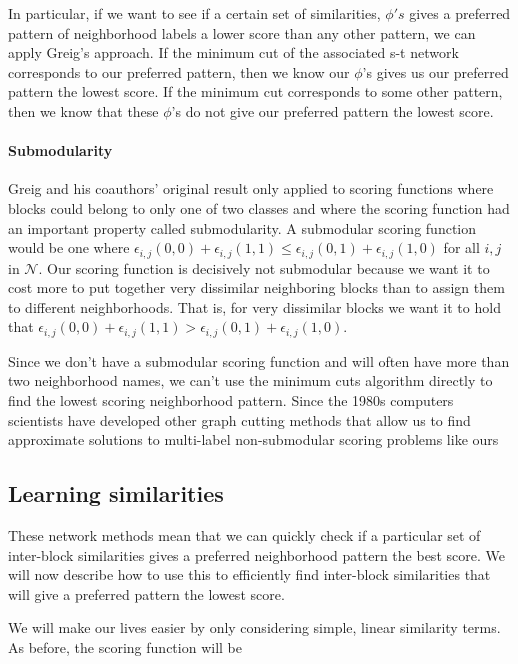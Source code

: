 In particular, if we want to see if a certain set of similarities,
$\phi's$ gives a preferred pattern of neighborhood labels a lower
score than any other pattern, we can apply Greig's approach. If the
minimum cut of the associated s-t network corresponds to our preferred
pattern, then we know our $\phi$'s gives us our
preferred pattern the lowest score. If the minimum cut corresponds to
some other pattern, then we know that these $\phi$'s do not give our
preferred pattern the lowest score.

\paragraph{Submodularity}
Greig and his coauthors' original result only applied to scoring functions 
where blocks could belong to only one of two classes and where the
scoring function had an important property called submodularity.  A
submodular scoring function would be one where $\epsilon_{i,j}(0,0) +
\epsilon_{i,j}(1,1) \leq \epsilon_{i,j}(0,1) + \epsilon_{i,j}(1,0)$
for all $i,j$ in $\mathcal{N}$. Our scoring function is decisively not
submodular because we want it to cost more to put together very
dissimilar neighboring blocks than to assign them to different
neighborhoods. That is, for very dissimilar blocks we want it to hold
that $\epsilon_{i,j}(0,0) + \epsilon_{i,j}(1,1) \boldsymbol{>}
\epsilon_{i,j}(0,1) + \epsilon_{i,j}(1,0)$.

Since we don't have a submodular scoring function and will often have
more than two neighborhood names, we can't use the minimum cuts
algorithm directly to find the lowest scoring neighborhood
pattern. Since the 1980s computers scientists have developed
other graph cutting methods that allow us to find approximate
solutions to multi-label non-submodular scoring problems like ours
\cite{kolmogorov_minimizing_2007}

\subsection{Learning similarities}
These network methods mean that we can quickly check if a
particular set of inter-block similarities gives a preferred
neighborhood pattern the best score. We will now describe how to use
this to efficiently find inter-block similarities that will give a
preferred pattern the lowest score.

We will make our lives easier by only considering simple, linear
similarity terms. As before, the scoring function will be

